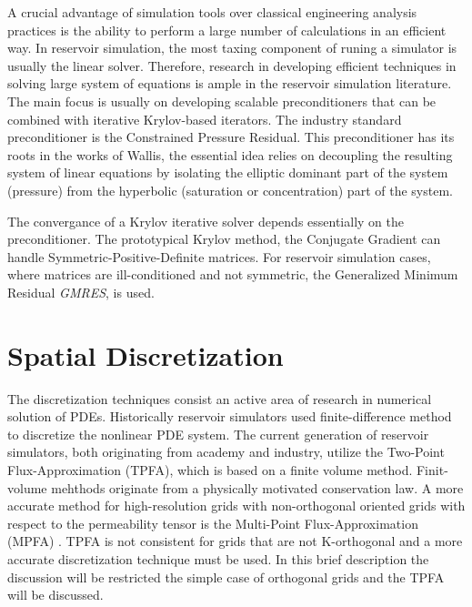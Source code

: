 A crucial advantage of simulation tools over classical engineering analysis practices is the ability
to perform a large number of calculations in an efficient way. In reservoir simulation, the most taxing
component of runing a simulator is usually the linear solver. Therefore, research in developing efficient
techniques in solving large system of equations is ample in the reservoir simulation literature. The main
focus is usually on developing scalable preconditioners that can be combined with iterative Krylov-based 
iterators. The industry standard preconditioner is the Constrained Pressure Residual. This preconditioner
has its roots in the works of Wallis\supercite{Wallis_1983,Wallis_1985}, the essential idea relies on decoupling
the resulting system of linear equations by isolating the elliptic dominant part of the system (pressure) from 
the hyperbolic (saturation or concentration) part of the system. 

The convergance of a Krylov iterative solver depends essentially on the preconditioner. The prototypical Krylov method, the
Conjugate Gradient can handle Symmetric-Positive-Definite matrices. For reservoir simulation cases, where matrices are ill-conditioned and
not symmetric, the Generalized Minimum Residual \textit{GMRES}, is used\supercite{roy}. 

\section{Spatial Discretization}
The discretization techniques consist an active area of research in numerical solution of PDEs. Historically reservoir simulators used 
finite-difference method to discretize the nonlinear PDE system. The current generation of reservoir simulators, both originating from
academy and industry, utilize the Two-Point Flux-Approximation (TPFA), which is based on a finite volume method. Finit-volume mehthods 
originate from a physically motivated conservation law. A more accurate method for high-resolution grids with non-orthogonal oriented 
grids with respect to the permeability tensor is the Multi-Point Flux-Approximation (MPFA) \cite{mpfa}. TPFA is not consistent for grids
that are not K-orthogonal and a more accurate discretization technique must be used. In this brief description the discussion will be
restricted the simple case of orthogonal grids and the TPFA will be discussed. 

